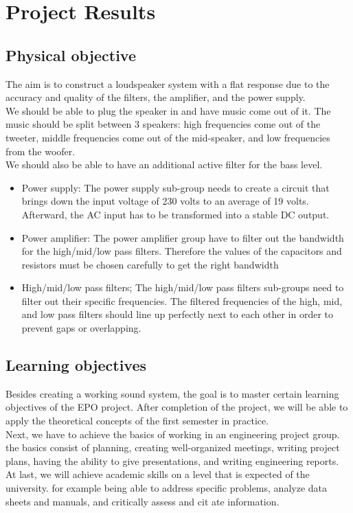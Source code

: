 
\chapter{Project Results }
\section{Physical objective}
The aim is to construct a loudspeaker system with a flat response due to the accuracy and quality of the filters, the amplifier, and the power supply.\\
We should be able to plug the speaker in and have music come out of it. The music should be split between 3 speakers: high frequencies come out of the tweeter, middle frequencies come out of the mid-speaker, and low frequencies from the woofer.\\
We should also be able to have an additional active filter for the bass level. 


\begin{itemize}
    \item Power supply: The power supply sub-group needs to create a circuit that brings down the input voltage of 230 volts to an average of 19 volts. Afterward, the AC input has to be transformed into a stable DC output. 
    \item Power amplifier: The power amplifier group have to filter out the bandwidth for the high/mid/low pass filters. Therefore the values of the capacitors and resistors must be chosen carefully to get the right bandwidth
    \item High/mid/low pass filters; The high/mid/low pass filters sub-groups need to filter out their specific frequencies. The filtered frequencies of the high, mid, and low pass filters should line up perfectly next to each other in order to prevent gaps or overlapping. 
\end{itemize}

    
    


\section{Learning objectives}
Besides creating a working sound system, the goal is to master certain learning objectives of the EPO project. After completion of the project, we will be able to apply the theoretical concepts of the first semester in practice.\\
Next, we have to achieve the basics of working in an engineering project group. the basics consist of planning, creating well-organized meetings, writing project plans, having the ability to give presentations, and writing engineering reports.\\
At last, we will achieve academic skills on a level that is expected of the university. for example being able to address specific problems, analyze data sheets and manuals, and critically assess and cit ate information.

